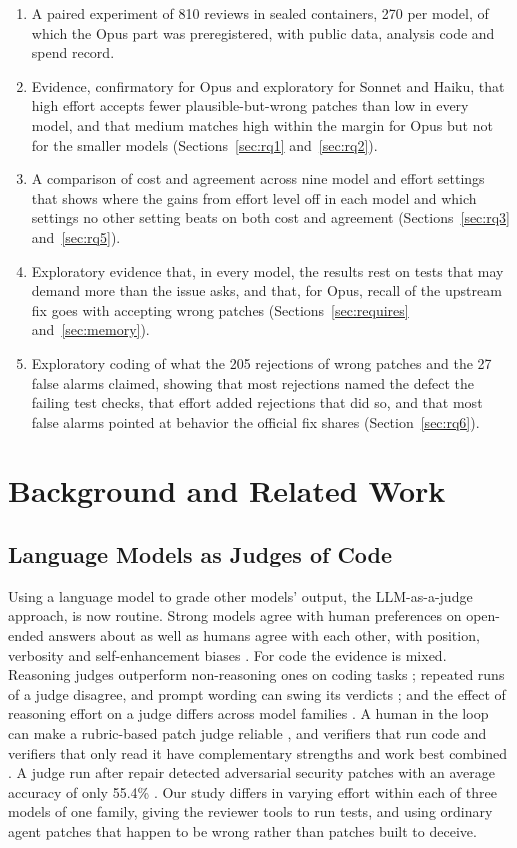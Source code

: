 \documentclass[sigconf,nonacm]{acmart}
\begin{document}
\begin{enumerate}
\item A paired experiment of 810 reviews in sealed containers, 270 per model, of which the Opus part was preregistered, with public data, analysis code and spend record.
\item Evidence, confirmatory for Opus and exploratory for Sonnet and Haiku, that high effort accepts fewer plausible-but-wrong patches than low in every model, and that medium matches high within the margin for Opus but not for the smaller models (Sections~\ref{sec:rq1} and~\ref{sec:rq2}).
\item A comparison of cost and agreement across nine model and effort settings that shows where the gains from effort level off in each model and which settings no other setting beats on both cost and agreement (Sections~\ref{sec:rq3} and~\ref{sec:rq5}).
\item Exploratory evidence that, in every model, the results rest on tests that may demand more than the issue asks, and that, for Opus, recall of the upstream fix goes with accepting wrong patches (Sections~\ref{sec:requires} and~\ref{sec:memory}).
\item Exploratory coding of what the 205 rejections of wrong patches and the 27 false alarms claimed, showing that most rejections named the defect the failing test checks, that effort added rejections that did so, and that most false alarms pointed at behavior the official fix shares (Section~\ref{sec:rq6}).
\end{enumerate}

\section{Background and Related Work}\label{sec:background}

\subsection{Language Models as Judges of Code}

Using a language model to grade other models' output, the LLM-as-a-judge approach, is now routine. Strong models agree with human preferences on open-ended answers about as well as humans agree with each other, with position, verbosity and self-enhancement biases \cite{zheng2023judging}. For code the evidence is mixed. Reasoning judges outperform non-reasoning ones on coding tasks \cite{jiang2026codejudgebench}; repeated runs of a judge disagree, and prompt wording can swing its verdicts \cite{zhao2026bias}; and the effect of reasoning effort on a judge differs across model families \cite{huang2025judge}. A human in the loop can make a rubric-based patch judge reliable \cite{shi2026hitl}, and verifiers that run code and verifiers that only read it have complementary strengths and work best combined \cite{jain2025r2egym}. A judge run after repair detected adversarial security patches with an average accuracy of only 55.4\% \cite{trad2026adversarial}. Our study differs in varying effort within each of three models of one family, giving the reviewer tools to run tests, and using ordinary agent patches that happen to be wrong rather than patches built to deceive.
\end{document}
